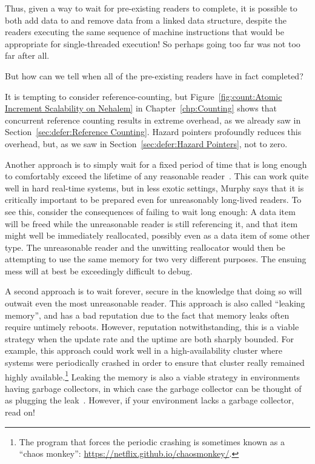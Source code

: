 Thus, given a way to wait for pre-existing readers to complete,
it is possible to both add data to and remove data from a linked
data structure, despite the readers executing the same sequence
of machine instructions that would be appropriate for single-threaded
execution!
So perhaps going too far was not too far after all.

But how can we tell when all of the pre-existing readers have in
fact completed?

It is tempting to consider reference-counting, but
Figure~\ref{fig:count:Atomic Increment Scalability on Nehalem}
in
Chapter~\ref{chp:Counting}
shows that concurrent reference counting results in extreme overhead,
as we already saw in
Section~\ref{sec:defer:Reference Counting}.
Hazard pointers profoundly reduces this overhead, but, as we saw in
Section~\ref{sec:defer:Hazard Pointers}, not to zero.

Another approach is to simply wait for a fixed period of time that is
long enough to comfortably exceed the lifetime of any reasonable
reader~\cite{Jacobson93,AjuJohn95}.
This can work quite well in hard real-time systems, but in less exotic
settings, Murphy says that it is critically important to be prepared
even for unreasonably long-lived readers.
To see this, consider the consequences of failing to wait long enough:
A data item will be freed while the unreasonable reader is still
referencing it, and that item might well be immediately reallocated,
possibly even as a data item of some other type.
The unreasonable reader and the unwitting reallocator would then
be attempting to use the same memory for two very different purposes.
The ensuing mess will at best be exceedingly difficult to debug.

A second approach is to wait forever, secure in the knowledge that
doing so will outwait even the most unreasonable reader.
This approach is also called ``leaking memory'', and has a bad reputation
due to the fact that memory leaks often require untimely reboots.
However, reputation notwithstanding, this is a viable strategy when
the update rate and the uptime are both sharply bounded.
For example, this approach could work well in a high-availability
cluster where systems were periodically crashed in order to ensure
that cluster really remained highly available.\footnote{
	The program that forces the periodic crashing is sometimes
	known as a ``chaos monkey'':
	\url{https://netflix.github.io/chaosmonkey/}.}
Leaking the memory is also a viable strategy in environments having
garbage collectors, in which case the garbage collector can be thought
of as plugging the leak~\cite{Kung80}.
However, if your environment lacks a garbage collector, read on!

